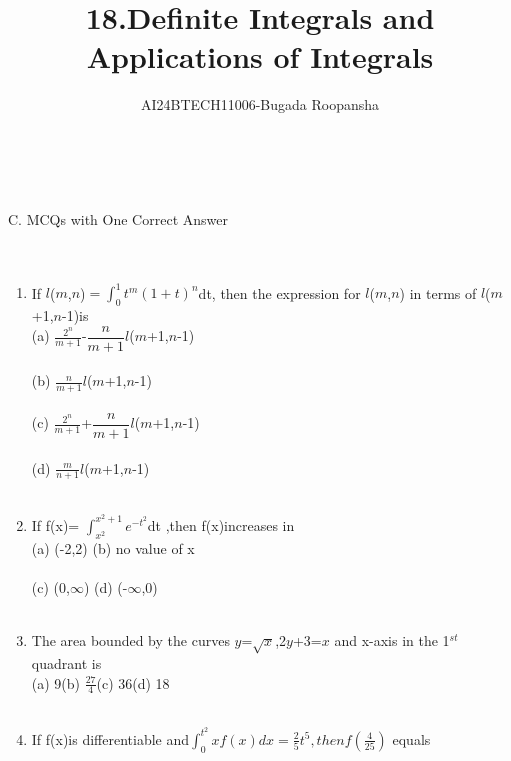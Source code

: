\documentclass[journal,12pt,twocolumn]{IEEEtran}
\theoremstyle{remark}
\begin{document}

\vspace{3cm}

\title{18.Definite Integrals and Applications of Integrals}
\author{AI24BTECH11006-Bugada Roopansha}

\\\\{C. MCQs with One Correct Answer}    
\\\\\\
\begin{enumerate}[start=21]
\item If $l$($m$,$n$)$=\int_{0}^{1}t^m(1+t)^n$dt, then the expression for $l$($m$,$n$) in terms of $l$($m$+1,$n$-1)is
\hspace*{\fill}
\\(a) $\frac{2^n}{m+1}$-$\dfrac{n}{m+1}$$l$($m$+1,$n$-1)
\\\\(b) $\frac{n}{m+1}$$l$($m$+1,$n$-1)
\\\\(c) $\frac{2^n}{m+1}$+$\dfrac{n}{m+1}$$l$($m$+1,$n$-1)
\\\\(d) $\frac{m}{n+1}$$l$($m$+1,$n$-1)
\\\\
\item If f(x)= $\int_{x^2}^{x^2+1}e^{-t^2}$dt ,then f(x)increases in
\hspace*{\fill}
\\(a)  (-2,2)
 \qquad       (b)  no value of x
\\\\(c)  (0,$\infty$)
\qquad(d)  (-$\infty$,0)
\\\\
\item The area bounded by the curves  $y$=$\sqrt{x}$,2$y$+3=$x$ and x-axis in the 1$^{st}$quadrant is
\hspace*{\fill}
\\(a) 9\quad(b) $\frac{27}{4}$\quad(c) 36\quad(d) 18
\\\\
\item If f(x)is differentiable and$\int_{0}^{t^2}xf(x)dx=\frac{2}{5}t^5, then f(\frac{4}{25})$ equals
\hspace*{\fill}

\end{enumerate}
\end{document}
